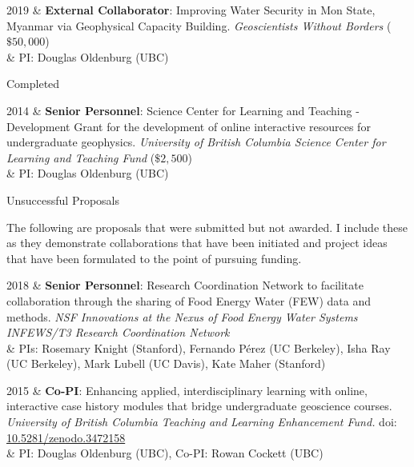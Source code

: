 \documentclass[a4paper, 11pt]{article}
\newcommand{\doi}[1]{doi: \href{https://doi.org/#1}{#1}}
\newcommand{\subheading}[1]{
    \vspace{0.4cm}
    {\Large #1}\\
    \vspace{-0.2cm}
}
\begin{document}
\begin{entryright}
2019 & \textbf{External Collaborator}: Improving Water Security in Mon State, Myanmar via Geophysical Capacity Building. \emph{Geoscientists Without Borders} ($\$50,000$) \\
& PI: Douglas Oldenburg (UBC) \\
\end{entryright}


\subheading{Completed}
\begin{entryright}
2014 & \textbf{Senior Personnel}: Science Center for Learning and Teaching - Development Grant for the development of online interactive resources for undergraduate geophysics. \emph{University of British Columbia Science Center for Learning and Teaching Fund} ($\$2,500$) \\
& PI: Douglas Oldenburg (UBC) \\
\end{entryright}

\subheading{Unsuccessful Proposals}

\noindent The following are proposals that were submitted but not awarded. I include these as they demonstrate collaborations that have been initiated and project ideas that have been formulated to the point of pursuing funding. \\

\begin{entryright}
2018 & \textbf{Senior Personnel}: Research Coordination Network to facilitate collaboration through the sharing of Food Energy Water (FEW) data and methods. \emph{NSF Innovations at the Nexus of Food Energy Water Systems INFEWS/T3 Research Coordination Network} \\
& PIs: Rosemary Knight (Stanford), Fernando P\'erez (UC Berkeley), Isha Ray (UC Berkeley), Mark Lubell (UC Davis), Kate Maher (Stanford) \\
\end{entryright}

\begin{entryright}
2015 & \textbf{Co-PI}: Enhancing applied, interdisciplinary learning with online, interactive case history modules that bridge undergraduate geoscience courses. \emph{University of British Columbia Teaching and Learning Enhancement Fund.} \doi{10.5281/zenodo.3472158} \\
& PI: Douglas Oldenburg (UBC), Co-PI: Rowan Cockett (UBC) \\
\end{entryright}
\end{document}
